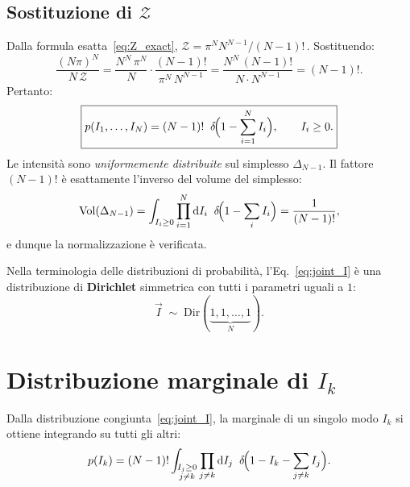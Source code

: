 \documentclass[a4paper,11pt]{article}
\newcommand{\de}{\mathrm{d}}
\begin{document}
\subsection{Sostituzione di $\mathcal{Z}$}

Dalla formula esatta~\eqref{eq:Z_exact},
$\mathcal{Z} = \pi^N N^{N-1}/(N-1)!$\,. Sostituendo:
\begin{equation}
  \frac{(N\pi)^N}{N\,\mathcal{Z}}
  = \frac{N^N\,\pi^N}{N} \cdot \frac{(N-1)!}{\pi^N\,N^{N-1}}
  = \frac{N^N \,(N-1)!}{N \cdot N^{N-1}}
  = (N-1)! .
\end{equation}
Pertanto:
\begin{equation}\label{eq:joint_I}
  \boxed{
  p(I_1, \dots, I_N)
  = (N-1)!\;\;\delta\!\Bigl(1 - \sum_{i=1}^{N} I_i\Bigr) ,
  \qquad I_i \geq 0 .
  }
\end{equation}
Le intensità sono \emph{uniformemente distribuite} sul simplesso
$\Delta_{N-1}$. Il fattore $(N-1)!$ è esattamente l'inverso del volume
del simplesso:
\begin{equation}
  \mathrm{Vol}(\Delta_{N-1})
  = \int_{\substack{I_i \geq 0}} \prod_{i=1}^{N} \de I_i \;\;
    \delta\!\Bigl(1 - \sum_{i} I_i\Bigr)
  = \frac{1}{(N-1)!} ,
\end{equation}
e dunque la normalizzazione è verificata.

Nella terminologia delle distribuzioni di probabilità,
l'Eq.~\eqref{eq:joint_I} è una distribuzione di \textbf{Dirichlet}
simmetrica con tutti i parametri uguali a $1$:
\begin{equation}
  \vec{I} \;\sim\; \mathrm{Dir}(\underbrace{1, 1, \dots, 1}_{N}) .
\end{equation}

\section{Distribuzione marginale di $I_k$}

Dalla distribuzione congiunta~\eqref{eq:joint_I}, la marginale di un
singolo modo $I_k$ si ottiene integrando su tutti gli altri:
\begin{equation}\label{eq:marginal_Ik_def}
  p(I_k)
  = (N-1)! \int_{\substack{I_j \geq 0 \\ j \neq k}}
    \prod_{j \neq k} \de I_j \;\;
    \delta\!\Bigl(1 - I_k - \sum_{j \neq k} I_j\Bigr) .
\end{equation}
\end{document}
